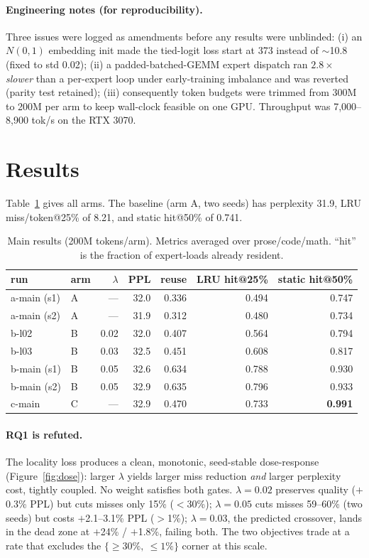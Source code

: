 \documentclass[11pt]{article}
\newcommand{\tps}{tok/s}
\begin{document}
\paragraph{Engineering notes (for reproducibility).}
Three issues were logged as amendments before any results were unblinded: (i) an
$N(0,1)$ embedding init made the tied-logit loss start at 373 instead of
$\sim$10.8 (fixed to std 0.02); (ii) a padded-batched-GEMM expert dispatch ran
$2.8\times$ \emph{slower} than a per-expert loop under early-training imbalance
and was reverted (parity test retained); (iii) consequently token budgets were
trimmed from 300M to 200M per arm to keep wall-clock feasible on one GPU.
Throughput was 7{,}000--8{,}900 \tps{} on the RTX 3070.

\section{Results}
\label{sec:results}
Table~\ref{tab:main} gives all arms. The baseline (arm A, two seeds) has
perplexity 31.9, LRU miss/token@25\% of 8.21, and static hit@50\% of 0.741.

\begin{table}[t]\centering
\caption{Main results (200M tokens/arm). Metrics averaged over prose/code/math.
``hit'' is the fraction of expert-loads already resident.}
\label{tab:main}
\small
\begin{tabular}{llrrrrr}
\toprule
run & arm & $\lambda$ & PPL & reuse & LRU hit@25\% & static hit@50\% \\
\midrule
a-main (s1) & A & --- & 32.0 & 0.336 & 0.494 & 0.747 \\
a-main (s2) & A & --- & 31.9 & 0.312 & 0.480 & 0.734 \\
b-l02       & B & 0.02 & 32.0 & 0.407 & 0.564 & 0.794 \\
b-l03       & B & 0.03 & 32.5 & 0.451 & 0.608 & 0.817 \\
b-main (s1) & B & 0.05 & 32.6 & 0.634 & 0.788 & 0.930 \\
b-main (s2) & B & 0.05 & 32.9 & 0.635 & 0.796 & 0.933 \\
c-main      & C & --- & 32.9 & 0.470 & 0.733 & \textbf{0.991} \\
\bottomrule
\end{tabular}
\end{table}

\paragraph{RQ1 is refuted.}
The locality loss produces a clean, monotonic, seed-stable dose-response
(Figure~\ref{fig:dose}): larger $\lambda$ yields larger miss reduction
\emph{and} larger perplexity cost, tightly coupled. No weight satisfies both
gates. $\lambda{=}0.02$ preserves quality ($+$0.3\% PPL) but cuts misses only
15\% ($<$30\%); $\lambda{=}0.05$ cuts misses 59--60\% (two seeds) but costs
$+$2.1--3.1\% PPL ($>$1\%); $\lambda{=}0.03$, the predicted crossover, lands in
the dead zone at $+$24\% / $+$1.8\%, failing both. The two objectives trade at a
rate that excludes the $\{{\ge}30\%,\ {\le}1\%\}$ corner at this scale.
\end{document}
